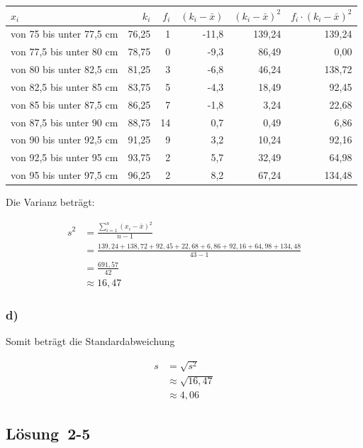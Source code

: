 \documentclass[
  11pt,
  ngerman,
  a4paper,
]{report}
\begin{document}
\begin{table}[H]
\centering
\begin{tabular}{lrrrrr}
\toprule
\textbf{$x_i$} & \textbf{$k_i$} & \textbf{$f_i$} & \textbf{$(k_i - \bar{x})$} & \textbf{$(k_i - \bar{x})^2$} & \textbf{$f_i \cdot (k_i - \bar{x})^2$}\\
\midrule
von 75 bis unter 77,5 cm & 76,25 & 1 & -11,8 & 139,24 & 139,24\\
von 77,5 bis unter 80 cm & 78,75 & 0 & -9,3 & 86,49 & 0,00\\
von 80 bis unter 82,5 cm & 81,25 & 3 & -6,8 & 46,24 & 138,72\\
von 82,5 bis unter 85 cm & 83,75 & 5 & -4,3 & 18,49 & 92,45\\
von 85 bis unter 87,5 cm & 86,25 & 7 & -1,8 & 3,24 & 22,68\\
von 87,5 bis unter 90 cm & 88,75 & 14 & 0,7 & 0,49 & 6,86\\
von 90 bis unter 92,5 cm & 91,25 & 9 & 3,2 & 10,24 & 92,16\\
von 92,5 bis unter 95 cm & 93,75 & 2 & 5,7 & 32,49 & 64,98\\
von 95 bis unter 97,5 cm & 96,25 & 2 & 8,2 & 67,24 & 134,48\\
\bottomrule
\end{tabular}
\end{table}

Die Varianz beträgt:

\[\begin{aligned}
  s^2&=\frac{\sum\limits_{i=1}^{n}(x_{i}-\bar{x})^2}{n-1} \\
     &=\frac{139{,}24+138{,}72+ 92{,}45+ 22{,}68+  6{,}86+ 92{,}16+ 64{,}98+134{,}48}{43-1}\\
     &=\frac{691{,}57}{42}\\
     &\approx{16{,}47}
\end{aligned}\]

\hypertarget{d}{%
\subsubsection{d)}\label{d}}

Somit beträgt die Standardabweichung

\[\begin{aligned}
  s&=\sqrt{s^2}\\
   &\approx\sqrt{16{,}47}\\
   &\approx4{,}06
\end{aligned}\]

\hypertarget{loesung-2-5}{%
\subsection{Lösung~2-5}\label{loesung-2-5}}
\end{document}
